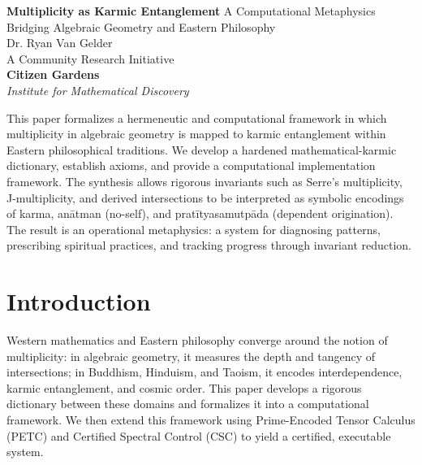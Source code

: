 \documentclass[12pt]{article}
\begin{document}
\begin{titlepage}
    \centering
 

\vspace*{1em}
  \Huge\textbf{Multiplicity as Karmic Entanglement}
  \LARGE{A Computational Metaphysics Bridging Algebraic Geometry and Eastern Philosophy}
    \vspace{1cm} \\
     \Large{Dr. Ryan Van Gelder}\\
   \vspace{1cm}
     \Large{A Community Research Initiative}
  \vspace{.5cm} \\
     {\bfseries Citizen Gardens}\\
     \vspace{.5cm}
    \textit{Institute for Mathematical Discovery}\\
    \vfill

   
    \vspace{0.5em}
    \begin{minipage}{0.85\textwidth}
        \small
This paper formalizes a hermeneutic and computational framework in which multiplicity in algebraic geometry is mapped to karmic entanglement within Eastern philosophical traditions. We develop a hardened mathematical-karmic dictionary, establish axioms, and provide a computational implementation framework. The synthesis allows rigorous invariants such as Serre's multiplicity, J-multiplicity, and derived intersections to be interpreted as symbolic encodings of karma, anātman (no-self), and pratītyasamutpāda (dependent origination). The result is an operational metaphysics: a system for diagnosing patterns, prescribing spiritual practices, and tracking progress through invariant reduction.


    \end{minipage}

\end{titlepage}

\section{Introduction}
Western mathematics and Eastern philosophy converge around the notion of multiplicity: in algebraic geometry, it measures the depth and tangency of intersections; in Buddhism, Hinduism, and Taoism, it encodes interdependence, karmic entanglement, and cosmic order. This paper develops a rigorous dictionary between these domains and formalizes it into a computational framework. We then extend this framework using Prime-Encoded Tensor Calculus (PETC) and Certified Spectral Control (CSC) to yield a certified, executable system.
\end{document}
